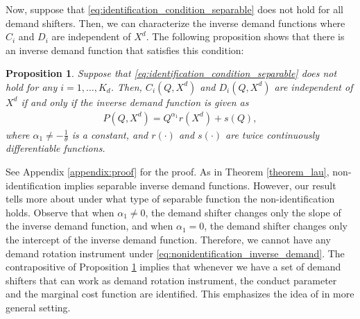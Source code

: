 \documentclass[11pt, a4paper]{article}
\newtheorem{proposition}{Proposition}
\theoremstyle{remark}
\begin{document}
Now, suppose that \eqref{eq:identification_condition_separable} does not hold for all demand shifters.
Then, we can characterize the inverse demand functions where $C_i$ and $D_i$ are independent of $X^{d}$.
The following proposition shows that there is an inverse demand function that satisfies this condition:
\begin{proposition}\label{proposition:nonidentification_inverse_demand}
    Suppose that \eqref{eq:identification_condition_separable} does not hold for any $i = 1, \ldots, K_d$.
    Then, $C_i(Q, X^{d})$ and $D_i(Q, X^{d})$ are independent of $X^{d}$ if and only if the inverse demand function is given as \begin{align}
        P(Q, X^{d}) = Q^{\alpha_1}r(X^{d}) + s(Q), \label{eq:nonidentification_inverse_demand}
    \end{align}
    where $\alpha_1 \ne -\frac{1}{\theta}$ is a constant, and $r(\cdot)$ and $s(\cdot)$ are twice continuously differentiable functions.
\end{proposition}
See Appendix \ref{appendix:proof} for the proof.
As in Theorem \ref{theorem_lau}, non-identification implies separable inverse demand functions.
However, our result tells more about under what type of separable function the non-identification holds.
Observe that when $\alpha_1 \ne 0$, the demand shifter changes only the slope of the inverse demand function, and when $\alpha_1 = 0$, the demand shifter changes only the intercept of the inverse demand function.
Therefore, we cannot have any demand rotation instrument under \eqref{eq:nonidentification_inverse_demand}.
The contrapositive of Proposition \ref{proposition:nonidentification_inverse_demand} implies that whenever we have a set of demand shifters that can work as demand rotation instrument, the conduct parameter and the marginal cost function are identified.
This emphasizes the idea of \citet{bresnahanOligopoly1982} in more general setting.
\end{document}
